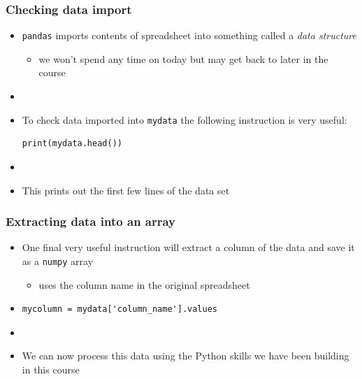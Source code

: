 \documentclass[english,14pt]{beamer}
\newcommand\red[1]{{\color{red} #1}}
\begin{document}

\begin{frame}[fragile]

\frametitle{Checking data import}

\begin{itemize}
	\item \texttt{pandas} imports contents of spreadsheet into something called a \red{\emph{data structure}}
	
	\begin{itemize}
	    \item we won't spend any time on today but may get back to later in the course
	\end{itemize}
	\item[]
	\item To check data imported into \texttt{mydata} the following instruction is very useful:
\begin{lstlisting}[style=CStyle]
print(mydata.head())
\end{lstlisting}
	\item[]
	\item This prints out the first few lines of the data set
\end{itemize}

\end{frame}


\begin{frame}[fragile]

\frametitle{Extracting data into an array}

\begin{itemize}
	\item One final very useful instruction will extract a column of the data and save it as a \texttt{numpy} array
	\begin{itemize}
		\item uses the column name in the original spreadsheet
	\end{itemize}
	
	\item[]
	
\begin{lstlisting}[style=CStyle]
mycolumn = mydata['column_name'].values   
\end{lstlisting}
	\item[]
	\item We can now process this data using the Python skills we have been building in this course
\end{itemize}

\end{frame}
\end{document}
